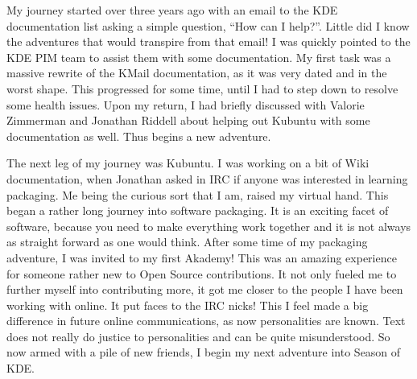 

\noindent{}My journey started over three years ago with an email to the KDE documentation list asking a simple question, “How can I help?”. Little did I know the adventures that would transpire from that email! I was quickly pointed to the KDE PIM team to assist them with some documentation.  My first task was a massive rewrite of the KMail documentation, as it was very dated and in the worst shape. This progressed for some time, until I had to step down to resolve some health issues. Upon my return, I had briefly discussed with Valorie Zimmerman and Jonathan Riddell about helping out Kubuntu with some documentation as well. Thus begins a new adventure.

The next leg of my journey was Kubuntu. I was working on a bit of Wiki documentation, when Jonathan asked in IRC if anyone was interested in learning packaging. Me being the curious sort that I am, raised my virtual hand. This began a rather long journey into software packaging. It is an exciting facet of software, because you need to make everything work together and it is not always as straight forward as one would think. After some time of my packaging adventure, I was invited to my first Akademy! This was an amazing experience for someone rather new to Open Source contributions. It not only fueled me to further myself into contributing more, it got me closer to the people I have been working with online. It put faces to the IRC nicks! This I feel made a big difference in future online communications, as now personalities are known. Text does not really do justice to personalities and can be quite misunderstood. So now armed with a pile of new friends, I begin my next adventure into Season of KDE.

